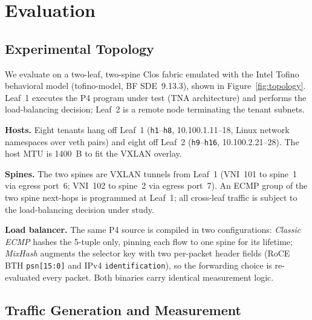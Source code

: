
\section{Evaluation}
\label{sec:evaluation}

\subsection{Experimental Topology}
\label{sec:topology}

We evaluate on a two-leaf, two-spine Clos fabric emulated with the Intel
Tofino behavioral model (tofino-model, BF SDE~9.13.3), shown in
Figure~\ref{fig:topology}. Leaf~1 executes the P4 program under test (TNA
architecture) and performs the load-balancing decision; Leaf~2 is a remote
node terminating the tenant subnets.

\textbf{Hosts.} Eight tenants hang off Leaf~1 (\texttt{h1}--\texttt{h8},
10.100.1.11--18, Linux network namespaces over veth pairs) and eight off
Leaf~2 (\texttt{h9}--\texttt{h16}, 10.100.2.21--28). The host MTU is
1400~B to fit the VXLAN overlay.

\textbf{Spines.} The two spines are VXLAN tunnels from Leaf~1 (VNI~101 to
spine~1 via egress port~6; VNI~102 to spine~2 via egress port~7). An ECMP
group of the two spine next-hops is programmed at Leaf~1; all cross-leaf
traffic is subject to the load-balancing decision under study.

\textbf{Load balancer.} The same P4 source is compiled in two
configurations: \emph{Classic ECMP} hashes the 5-tuple only, pinning each
flow to one spine for its lifetime; \emph{MixHash} augments the selector
key with two per-packet header fields (RoCE BTH \texttt{psn[15:0]} and
IPv4 \texttt{identification}), so the forwarding choice is re-evaluated
every packet. Both binaries carry identical measurement logic.

\subsection{Traffic Generation and Measurement}
\label{sec:methodology}

